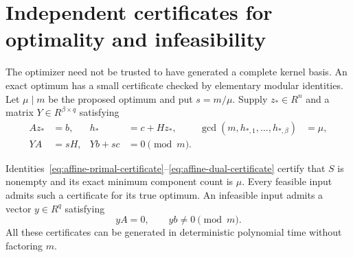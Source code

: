 \section{Independent certificates for optimality and infeasibility}
\label{sec:certificates}

The optimizer need not be trusted to have generated a complete kernel basis.
An exact optimum has a small certificate checked by elementary modular
identities.  Let $\mu\mid m$ be the proposed optimum and put $s=m/\mu$.
Supply $z_*\in R^n$ and a matrix $Y\in R^{\beta\times q}$ satisfying
\begin{align}
 Az_*&=b, & h_*&=c+Hz_*, &\gcd(m,h_{*,1},\ldots,h_{*,\beta})&=\mu,
 \label{eq:affine-primal-certificate}\\
 YA&=sH, &Yb+sc&=0\pmod m.
 \label{eq:affine-dual-certificate}
\end{align}

\begin{theorem}
Identities~\eqref{eq:affine-primal-certificate}--\eqref{eq:affine-dual-certificate}
certify that $S$ is nonempty and its exact minimum component count is $\mu$.
Every feasible input admits such a certificate for its true optimum.
An infeasible input admits a vector $y\in R^q$ satisfying
\begin{equation}
 yA=0,\qquad yb\ne0\pmod m.
 \label{eq:affine-infeasibility-certificate}
\end{equation}
All these certificates can be generated in deterministic polynomial time
without factoring $m$.
\end{theorem}

